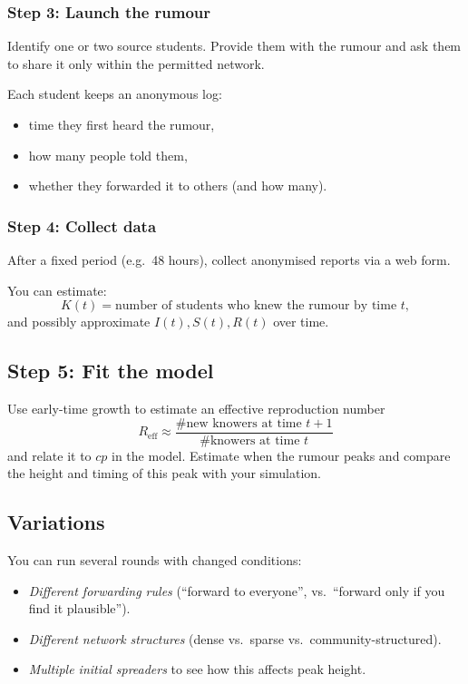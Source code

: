 \documentclass[11pt]{article}
\begin{document}
\subsubsection*{Step 3: Launch the rumour}

Identify one or two source students. Provide them with the rumour and
ask them to share it only within the permitted network.

Each student keeps an anonymous log:
\begin{itemize}
    \item time they first heard the rumour,
    \item how many people told them,
    \item whether they forwarded it to others (and how many).
\end{itemize}

\subsubsection*{Step 4: Collect data}
After a fixed period (e.g.\ 48 hours), collect anonymised reports via a
web form.

You can estimate:
\[
K(t) = \text{number of students who knew the rumour by time } t,
\]
and possibly approximate $I(t), S(t), R(t)$ over time.

\subsection*{Step 5: Fit the model}

Use early-time growth to estimate an effective reproduction number
\[
R_{\text{eff}} \approx
\frac{\text{\# new knowers at time } t+1}
     {\text{\# knowers at time } t}
\]
and relate it to $c p$ in the model. Estimate when the rumour peaks and
compare the height and timing of this peak with your simulation.

\subsection*{Variations}

You can run several rounds with changed conditions:

\begin{itemize}
    \item \emph{Different forwarding rules} (``forward to everyone'',
    vs.\ ``forward only if you find it plausible'').
    \item \emph{Different network structures} (dense vs.\ sparse vs.\
    community-structured).
    \item \emph{Multiple initial spreaders} to see how this affects peak height.
\end{itemize}
\end{document}
